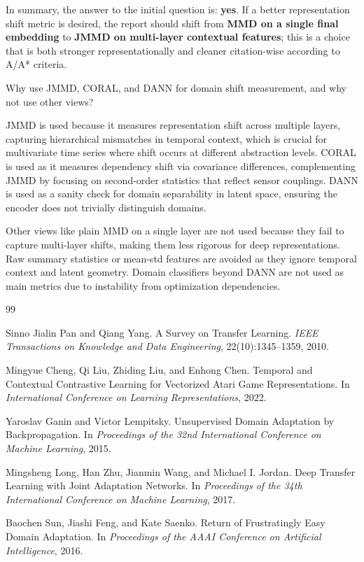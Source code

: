 \documentclass[a4paper]{article}
\begin{document}
In summary, the answer to the initial question is: \textbf{yes}. If a better representation shift metric is desired, the report should shift from \textbf{MMD on a single final embedding} to \textbf{JMMD on multi-layer contextual features}; this is a choice that is both stronger representationally and cleaner citation-wise according to A/A* criteria.

Why use JMMD, CORAL, and DANN for domain shift measurement, and why not use other views?

JMMD is used because it measures representation shift across multiple layers, capturing hierarchical mismatches in temporal context, which is crucial for multivariate time series where shift occurs at different abstraction levels. CORAL is used as it measures dependency shift via covariance differences, complementing JMMD by focusing on second-order statistics that reflect sensor couplings. DANN is used as a sanity check for domain separability in latent space, ensuring the encoder does not trivially distinguish domains.

Other views like plain MMD on a single layer are not used because they fail to capture multi-layer shifts, making them less rigorous for deep representations. Raw summary statistics or mean-std features are avoided as they ignore temporal context and latent geometry. Domain classifiers beyond DANN are not used as main metrics due to instability from optimization dependencies.

\begin{thebibliography}{99}

Sinno Jialin Pan and Qiang Yang.
\newblock A Survey on Transfer Learning.
\newblock \emph{IEEE Transactions on Knowledge and Data Engineering}, 22(10):1345--1359, 2010.

Mingyue Cheng, Qi Liu, Zhiding Liu, and Enhong Chen.
\newblock Temporal and Contextual Contrastive Learning for Vectorized Atari Game Representations.
\newblock In \emph{International Conference on Learning Representations}, 2022.

Yaroslav Ganin and Victor Lempitsky.
\newblock Unsupervised Domain Adaptation by Backpropagation.
\newblock In \emph{Proceedings of the 32nd International Conference on Machine Learning}, 2015.

Mingsheng Long, Han Zhu, Jianmin Wang, and Michael I. Jordan.
\newblock Deep Transfer Learning with Joint Adaptation Networks.
\newblock In \emph{Proceedings of the 34th International Conference on Machine Learning}, 2017.

Baochen Sun, Jiashi Feng, and Kate Saenko.
\newblock Return of Frustratingly Easy Domain Adaptation.
\newblock In \emph{Proceedings of the AAAI Conference on Artificial Intelligence}, 2016.

\end{thebibliography}
\end{document}
